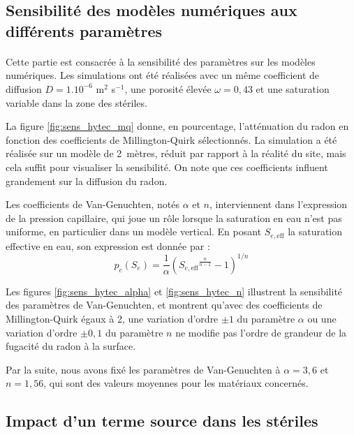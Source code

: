 \documentclass{article}
\begin{document}
\subsection{Sensibilité des modèles numériques aux différents paramètres}
\label{annexe:sens_numerique}

\paragraph{} Cette partie est consacrée à la sensibilité des paramètres sur les modèles numériques. Les simulations ont été réalisées avec un même coefficient de diffusion $D = 1.10^{-6}$ m$^2 \!$ s$^{-1}$, une porosité élevée $\omega = 0,43$ et une saturation variable dans la zone des stériles.

La figure \ref{fig:sens_hytec_mq} donne, en pourcentage, l'atténuation du radon en fonction des coefficients de Millington-Quirk sélectionnés. La simulation a été réalisée sur un modèle de 2~mètres, réduit par rapport à la réalité du site, mais cela suffit pour visualiser la sensibilité. On note que ces coefficients influent grandement sur la diffusion du radon.

Les coefficients de Van-Genuchten, notés $\alpha$ et $n$, interviennent dans l’expression de la pression capillaire, qui joue un rôle lorsque la saturation en eau n’est pas uniforme, en particulier dans un modèle vertical. En posant $S_{e,\text{eff}}$ la saturation effective en eau, son expression est donnée par :
$$
p_c (S_e)= \dfrac{1}{\alpha} \left( {S_{e,\text{eff}} }^{\frac{n}{n-1}} -1 \right)^{1/n}
$$

Les figures \ref{fig:sens_hytec_alpha} et \ref{fig:sens_hytec_n} illustrent la sensibilité des paramètres de Van-Genuchten, et montrent qu'avec des coefficients de Millington-Quirk égaux à 2, une variation d’ordre $\pm 1$ du paramètre $\alpha$ ou une variation d’ordre $\pm 0,1$ du paramètre $n$ ne modifie pas l’ordre de grandeur de la fugacité du radon à la surface.

Par la suite, nous avons fixé les paramètres de Van-Genuchten à $\alpha = 3,6$ et $n=1,56$, qui sont des valeurs moyennes pour les matériaux concernés.

\subsection{Impact d'un terme source dans les stériles}
\label{annexe:termesource}
\end{document}
